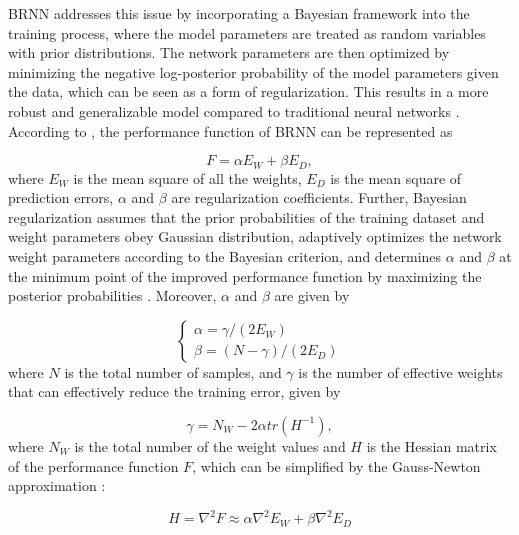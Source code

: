 \ac{BRNN} addresses this issue by incorporating a Bayesian framework into the training process, where the model parameters are treated as random variables with prior distributions. The network parameters are then optimized by minimizing the negative log-posterior probability of the model parameters given the data, which can be seen as a form of regularization. This results in a more robust and generalizable model compared to traditional neural networks \cite{mackay1992Bayesian, burden2008Bayesian}. According to , the performance function of \ac{BRNN} can be represented as

\begin{equation}
    F = \alpha E_W + \beta E_D,
\end{equation}
where $E_W$ is the mean square of all the weights, $E_D$ is the mean square of prediction errors, $\alpha$ and $\beta$ are regularization coefficients. Further, Bayesian regularization assumes that the prior probabilities of the training dataset and weight parameters obey Gaussian distribution, adaptively optimizes the network weight parameters according to the Bayesian criterion, and determines $\alpha$ and $\beta$ at the minimum point of the improved performance function by maximizing the posterior probabilities \cite{zhou2022Determination}. Moreover, $\alpha$ and $\beta$ are given by

\begin{equation}
    \begin{cases}
        \alpha = \gamma / \left(2E_W\right) \\
        \beta = \left(N - \gamma\right) / \left(2E_D\right)
    \end{cases}
\end{equation}
where $N$ is the total number of samples, and $\gamma$ is the number of effective weights that can effectively reduce the training error, given by

\begin{equation}
    \gamma = N_W - 2\alpha tr\left(H^{-1}\right),
\end{equation}
where $N_W$ is the total number of the weight values and $H$ is the Hessian matrix of the performance function $F$, which can be simplified by the Gauss-Newton approximation \cite{mackay1992Bayesian}:

\begin{equation}
    H = \nabla^2 F \approx \alpha \nabla^2E_W + \beta \nabla^2E_D
\end{equation}

